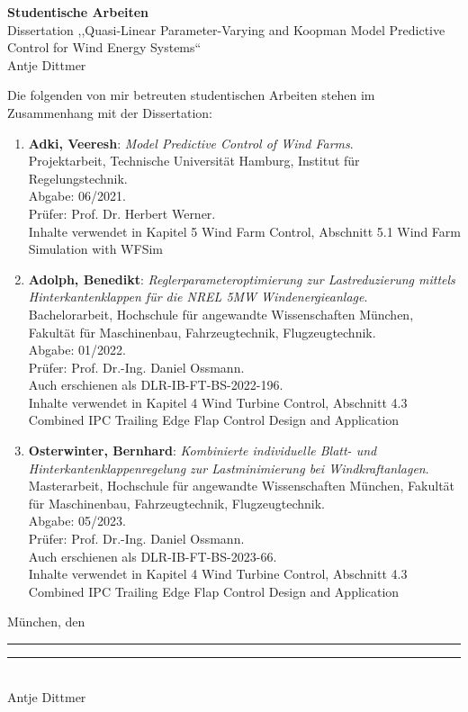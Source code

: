 \documentclass[11pt,a4paper]{article}
\begin{document}
\begin{center}
  {\Large \textbf{Studentische Arbeiten}}\\[0.3cm]
  {\large Dissertation ,,Quasi-Linear Parameter-Varying and Koopman Model Predictive Control for Wind Energy Systems``}\\[0.3cm]
  Antje Dittmer
\end{center}

\vspace{0.5cm}

\noindent
Die folgenden von mir betreuten studentischen Arbeiten stehen im Zusammenhang mit der Dissertation:

\begin{enumerate}[leftmargin=*, itemsep=0.4cm]

  \item \textbf{Adki, Veeresh}: \emph{Model Predictive Control of Wind Farms}.\\
  Projektarbeit, Technische Universit\"at Hamburg, Institut f\"ur Regelungstechnik.\\
  Abgabe: 06/2021.\\ %
  Pr\"ufer: Prof. Dr. Herbert Werner.\\
  Inhalte verwendet in Kapitel 5 Wind Farm Control, Abschnitt 5.1 Wind Farm Simulation with WFSim

  \item \textbf{Adolph, Benedikt}: \emph{Reglerparameteroptimierung zur Lastreduzierung mittels Hinterkantenklappen f\"ur die NREL 5MW Windenergieanlage}.\\
  Bachelorarbeit, Hochschule für angewandte Wissenschaften M\"unchen, Fakult\"at für Maschinenbau, Fahrzeugtechnik, Flugzeugtechnik.\\
  Abgabe: 01/2022.\\ %
  Pr\"ufer: Prof. Dr.-Ing. Daniel Ossmann.\\
  Auch erschienen als DLR-IB-FT-BS-2022-196.\\
  Inhalte verwendet in Kapitel 4 Wind Turbine Control, Abschnitt 4.3 Combined IPC Trailing Edge Flap Control Design and Application

  \item \textbf{Osterwinter, Bernhard}: \emph{Kombinierte individuelle Blatt- und Hinterkantenklappenregelung zur Lastminimierung bei Windkraftanlagen}.\\
  Masterarbeit,  Hochschule für angewandte Wissenschaften M\"unchen, Fakult\"at für Maschinenbau, Fahrzeugtechnik, Flugzeugtechnik.\\
  Abgabe: 05/2023.\\
  Pr\"ufer: Prof. Dr.-Ing. Daniel Ossmann.\\
  Auch erschienen als  DLR-IB-FT-BS-2023-66.\\
   Inhalte verwendet in Kapitel 4 Wind Turbine Control, Abschnitt 4.3 Combined IPC Trailing Edge Flap Control Design and Application

\end{enumerate}
\vspace{1cm}
\noindent
M\"unchen, den \rule{3cm}{0.4pt} \hfill \rule{5cm}{0.4pt}\\
\phantom{M\"unchen, den Datum} \hfill Antje Dittmer
\end{document}
